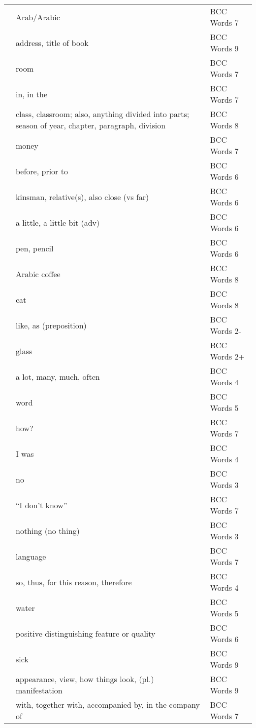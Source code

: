 \documentclass[10pt,twocolumn]{article}
\begin{document}
\begin{supertabular*}{\linewidth}{p{0.1\textwidth}p{0.2\textwidth}>{\footnotesize}p{0.2\textwidth}}
 & Arab/Arabic & BCC Words 7 \\
 & address, title of book & BCC Words 9 \\
 & room & BCC Words 7 \\
 & in, in the & BCC Words 7 \\
 & class, classroom; also, anything divided into parts; season of year, chapter, paragraph, division & BCC Words 8 \\
 & money & BCC Words 7 \\
 & before, prior to & BCC Words 6 \\
 & kinsman, relative(s), also close (vs far) & BCC Words 6 \\
 & a little, a little bit (adv) & BCC Words 6 \\
 & pen, pencil & BCC Words 6 \\
 & Arabic coffee & BCC Words 8 \\
 & cat & BCC Words 8 \\
 & like, as (preposition) & BCC Words 2- \\
 & glass & BCC Words 2+ \\
 & a lot, many, much, often & BCC Words 4 \\
 & word & BCC Words 5 \\
 & how? & BCC Words 7 \\
 & I was & BCC Words 4 \\
 & no & BCC Words 3 \\
 & ``I don't know'' & BCC Words 7 \\
 & nothing (no thing) & BCC Words 3 \\
 & language & BCC Words 7 \\
 & so, thus, for this reason, therefore & BCC Words 4 \\
 & water & BCC Words 5 \\
 & positive distinguishing feature or quality & BCC Words 6 \\
 & sick & BCC Words 9 \\
 & appearance, view, how things look, (pl.) manifestation & BCC Words 9 \\
 & with, together with, accompanied by, in the company of & BCC Words 7 \\

\end{supertabular*}
\end{document}

